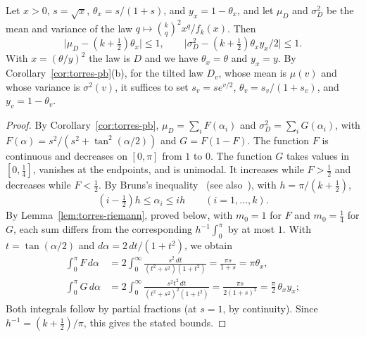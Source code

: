 \begin{lema}\label{lem:torres-momentos}
Let $x>0$, $s=\sqrt x$, $\theta_x=s/(1+s)$, and $y_x=1-\theta_x$, and let $\mu_D$ and $\sigma_D^2$ be the
mean and
variance of the law $q\mapsto\binom kq^2x^q/f_k(x)$. Then
\[
 \bigl|\mu_D-(k+\tfrac12)\theta_x\bigr|\le1,\qquad \bigl|\sigma_D^2-(k+\tfrac12)\theta_xy_x/2\bigr|\le1.
\]
With $x=(\theta/y)^2$ the law is $D$ and we have $\theta_x=\theta$ and $y_x=y$. By
Corollary~\ref{cor:torres-pb}(b), for the tilted law $D_v$, whose mean is $\mu(v)$ and whose variance is
$\sigma^2(v)$, it suffices to set $s_v=se^{v/2}$, $\theta_v=s_v/(1+s_v)$, and $y_v=1-\theta_v$.
\end{lema}
\begin{proof}
By Corollary~\ref{cor:torres-pb}, $\mu_D=\sum_iF(\alpha_i)$ and $\sigma_D^2=\sum_iG(\alpha_i)$, with
$F(\alpha)=s^2/(s^2+\tan^2(\alpha/2))$ and $G=F(1-F)$. The function $F$ is continuous and decreases on
$[0,\pi]$ from $1$ to $0$. The function $G$ takes values in $[0,\frac14]$, vanishes at the endpoints, and is
unimodal. It increases while $F>\frac12$ and decreases while $F<\frac12$. By Bruns's
inequality~\cite{Bruns} (see also~\cite[\S6.21]{Szego}), with $h=\pi/(k+\frac12)$,
\[
 (i-\tfrac12)h\le\alpha_i\le ih\qquad(i=1,\dots,k).
\]
By Lemma~\ref{lem:torres-riemann}, proved below, with $m_0=1$ for $F$ and
$m_0=\frac14$ for $G$, each sum differs from the corresponding $h^{-1}\int_0^\pi$ by at most $1$. With
$t=\tan(\alpha/2)$ and
$d\alpha=2\,dt/(1+t^2)$, we obtain
\[
\begin{aligned}
 \int_0^\pi F\,d\alpha&=2\int_0^\infty\frac{s^2\,dt}{(t^2+s^2)(1+t^2)}=\frac{\pi s}{1+s}=\pi\theta_x,\\
 \int_0^\pi G\,d\alpha&=2\int_0^\infty\frac{s^2t^2\,dt}{(t^2+s^2)^2(1+t^2)}=\frac{\pi s}{2(1+s)^2}
 =\frac\pi2\,\theta_xy_x;
\end{aligned}
\]
Both integrals follow by partial fractions (at $s=1$, by continuity). Since $h^{-1}=(k+\frac12)/\pi$, this
gives
the stated bounds.
\end{proof}

